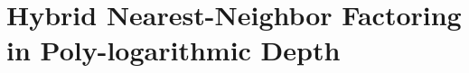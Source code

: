 \chapter {Hybrid Nearest-Neighbor Factoring in Poly-logarithmic Depth}
\label{chap:factor-polylog}















